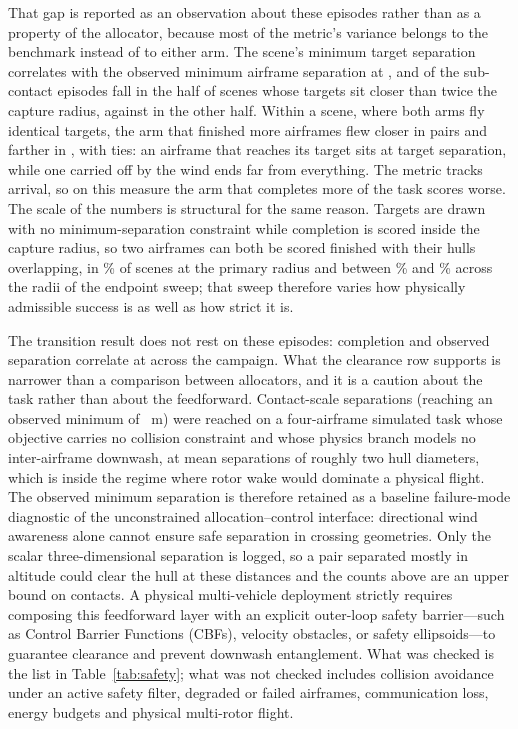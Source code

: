 That gap is reported as an observation about these episodes rather than as a
property of the allocator, because most of the metric's variance belongs to the
benchmark instead of to either arm. The scene's minimum target separation
correlates with the observed minimum airframe separation at
\SafetyGeomTargetCorr{}, and \SafetyGeomCloseTargetContacts{} of the
\SafetyGeomHullContacts{} sub-contact episodes fall in the half of scenes whose
targets sit closer than twice the capture radius, against
\SafetyGeomFarTargetContacts{} in the other half. Within a scene, where both arms
fly identical targets, the arm that finished more airframes flew closer in
\SafetyGeomPairedCloser{} pairs and farther in \SafetyGeomPairedFarther{}, with
\SafetyGeomPairedTied{} ties: an airframe that reaches its target sits at target
separation, while one carried off by the wind ends far from everything. The metric
tracks arrival, so on this measure the arm that completes more of the task scores
worse. The scale of the numbers is structural for the same reason. Targets are
drawn with no minimum-separation constraint while completion is scored inside the
capture radius, so two airframes can both be scored finished with their hulls
overlapping, in \SafetyGeomOverlapPrimary{}\% of scenes at the primary radius and
between \SafetyGeomOverlapMin{}\% and \SafetyGeomOverlapMax{}\% across the radii
of the endpoint sweep; that sweep therefore varies how physically admissible
success is as well as how strict it is.

The transition result does not rest on these episodes: completion and observed
separation correlate at \SafetyGeomCompletionCorr{} across the campaign. What the
clearance row supports is narrower than a comparison between allocators, and it is
a caution about the task rather than about the feedforward. Contact-scale
separations (reaching an observed minimum of \SafetyWorstSeparation{}~m) were
reached on a four-airframe simulated task whose objective carries no collision
constraint and whose physics branch models no inter-airframe downwash, at mean
separations of roughly two hull diameters, which is inside the regime where rotor
wake would dominate a physical flight. The observed minimum separation is
therefore retained as a baseline failure-mode diagnostic of the unconstrained
allocation--control interface: directional wind awareness alone cannot ensure
safe separation in crossing geometries. Only the scalar three-dimensional
separation is logged, so a pair separated mostly in altitude could clear the hull
at these distances and the counts above are an upper bound on contacts. A
physical multi-vehicle deployment strictly requires composing this feedforward
layer with an explicit outer-loop safety barrier—such as Control Barrier
Functions (CBFs), velocity obstacles, or safety ellipsoids—to guarantee clearance
and prevent downwash entanglement. What was checked is the list in
Table~\ref{tab:safety}; what was not checked includes collision avoidance under an
active safety filter, degraded or failed airframes, communication loss, energy
budgets and physical multi-rotor flight.

